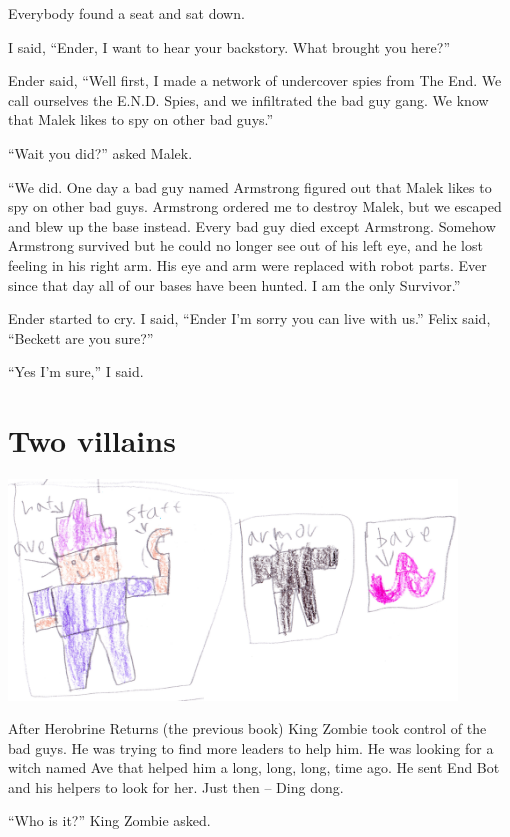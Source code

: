 \documentclass[booklet, twoside, 12pt]{krantz}
\begin{document}
Everybody found a seat and sat down.

I said, ``Ender, I want to hear your backstory. What brought you here?''

Ender said, ``Well first, I made a network of undercover spies from The
End. We call ourselves the E.N.D. Spies, and we infiltrated the bad guy
gang. We know that Malek likes to spy on other bad guys.''

``Wait you did?'' asked Malek.

``We did. One day a bad guy named Armstrong figured out that Malek likes
to spy on other bad guys. Armstrong ordered me to destroy Malek, but we
escaped and blew up the base instead. Every bad guy died except
Armstrong. Somehow Armstrong survived but he could no longer see out of
his left eye, and he lost feeling in his right arm. His eye and arm were
replaced with robot parts. Ever since that day all of our bases have
been hunted. I am the only Survivor.''

Ender started to cry. I said, ``Ender I'm sorry you can live with us.''
Felix said, ``Beckett are you sure?''

``Yes I'm sure,'' I said.

\hypertarget{two-villains}{%
\section{Two villains}\label{two-villains}}

\includegraphics[width=4.6875in,height=\textheight]{img/four-bad-guys/avestuff.jpg}

After Herobrine Returns (the previous book) King Zombie took control of
the bad guys. He was trying to find more leaders to help him. He was
looking for a witch named Ave that helped him a long, long, long, time
ago. He sent End Bot and his helpers to look for her. Just then -- Ding
dong.

``Who is it?'' King Zombie asked.
\end{document}
